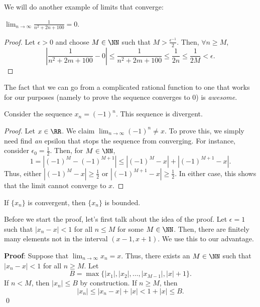 

\noindent We will do another example of limits that converge:
\begin{example}
$\lim_{n\to \infty} \frac{1}{n^2 + 2n + 100}=0.$
\end{example}
\begin{proof}
Let $\epsilon>0$ and choose $M\in \NN$ such that $M> \frac{\epsilon^{-1}}{2}$. Then, $\forall n \geq M$,
\[
\left|\frac{1}{n^2 +2m +100} -0\right| \leq \frac{1}{n^2 +2m +100} \leq \frac{1}{2n} \leq \frac{1}{2M} < \epsilon.
\]
\end{proof}

The fact that we can go from a complicated rational function to one that works for our purposes (namely to prove the sequence converges to 0) is \textit{awesome}. 

\begin{example}
Consider the sequence $x_n = (-1)^n$. This sequence is divergent.
\end{example}
\begin{proof}
Let $x\in \RR$. We claim $\lim_{n\to \infty} (-1)^n \neq x$. To prove this, we simply need find \textit{an} epsilon that stops the sequence from converging. For instance, consider $\epsilon_0 = \frac{1}{2}$. Then, for $M\in \NN$,
\[
1 = |(-1)^M - (-1)^{M+1}| \leq |(-1)^M -x|+|(-1)^{M+1}-x|.
\]
Thus, either $|(-1)^M-x|\geq \frac{1}{2}$ or $|(-1)^{M+1}-x|\geq \frac{1}{2}$. In either case, this shows that the limit cannot converge to $x$.
\end{proof}

\begin{theorem}
If $\{x_n\}$ is convergent, then $\{x_n\}$ is bounded.
\end{theorem}
Before we start the proof, let's first talk about the idea of the proof. Let $\epsilon = 1$ such that $|x_n-x|<1$ for all $n\leq M$ for some $M\in \NN$. Then, there are finitely many elements not in the interval $(x-1,x+1)$. We use this to our advantage.

\textbf{Proof}: Suppose that $\lim_{n\to \infty}x_n = x$. Thus, there exists an $M\in\NN$ such that $|x_n-x|<1$ for all $n\geq M$. Let 
\[
B = \max\{|x_1|, |x_2|,\dots, |x_{M-1}|, |x|+1\}.
\]
If $n <M$, then $|x_n| \leq B$ by construction. If $n\geq M$, then \[
|x_n| \leq |x_n-x| + |x| <1+|x| \leq B.
\] \qed 

